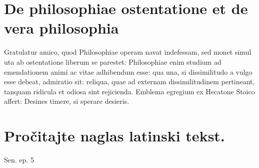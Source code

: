


\section*{De philosophiae ostentatione et de vera philosophia}

Gratulatur amico, quod Philosophiae operam navat indefessam, sed monet simul uta ab ostentatione liberum se parestet: Philosophiae enim studium ad emendationem animi ac vitae adhibendum esse: qua una, si dissimilitudo a vulgo esse debeat, admiratio sit: reliqua, quae ad externam dissimilitudinem pertineant, tanquam ridicula et odiosa sint rejicienda. Emblema egregium ex Hecatone Stoico affert: Desines timere, si sperare desieris.


\section*{Pročitajte naglas latinski tekst.}


Sen. ep. 5

\medskip


